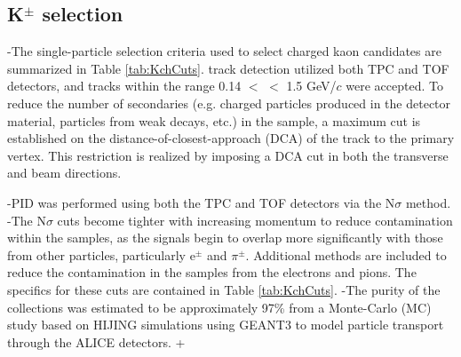  
 \subsection{K$^{\pm}$ selection}
 \label{sec:KchSelection}
-The single-particle selection criteria used to select charged kaon candidates are summarized in Table \ref{tab:KchCuts}.
\underline{}
 \Kpm track detection utilized both TPC and TOF detectors, and tracks within the range 0.14 $<$ \pt $<$ 1.5 GeV/$c$ were accepted.
 To reduce the number of secondaries (e.g. charged particles produced in the detector material, particles from weak decays, etc.) in the sample, a maximum cut is established on the distance-of-closest-approach (DCA) of the track to the primary vertex.
 This restriction is realized by imposing a DCA cut in both the transverse and beam directions.
 
-PID was performed using both the TPC and TOF detectors via the $\mathrm{N}\sigma$ method. 
-The $\mathrm{N}\sigma$ cuts become tighter with increasing momentum to reduce contamination within the samples, as the \Kpm signals begin to overlap more significantly with those from other particles, particularly e$^{\pm}$ and $\pi^{\pm}$.
\underline{}
\underline{}
 Additional methods are included to reduce the contamination in the \Kpm samples from the electrons and pions.  
 The specifics for these cuts are contained in Table \ref{tab:KchCuts}.
-The purity of the \Kpm collections was estimated to be approximately 97\% from a Monte-Carlo (MC) study based on HIJING \cite{PhysRevD.44.3501} simulations using GEANT3 \cite{Brun:1994aa} to model particle transport through the ALICE detectors. 
\underline{}
\underline{}
+
 
